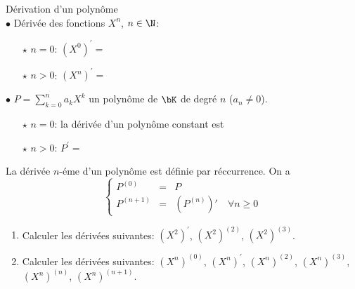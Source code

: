 \documentclass[a4paper, 11pt,reqno]{article}
\begin{document}
\begin{defi} D\'erivation d'un polyn\^ome\\

	$\bullet$ D\'eriv\'ee des fonctions $X^n$, $n\in\N$:\vsec\vsec
	\begin{itemize}
		\item[$\star$] $n=0$: $(X^0)^{\prime}=$\dotfill \vsec
		\item[$\star$] $n>0$: $(X^n)^{\prime}=$\dotfill \vsec
	\end{itemize}

	\quad

	$\bullet$ $P=\sum\limits_{k=0}^n a_kX^k$ un polyn\^ome de $\bK$ de degr\'e $n$ ($a_n\not= 0$).\vsec
	\begin{itemize}
		\item[$\star$] $n=0$: la d\'eriv\'ee d'un polyn\^ome constant est \dotfill  \vsec
		\item[$\star$] $n>0$: $P^{\prime}=$\dotfill \vsec
	\end{itemize}

\end{defi}
\vsec\vsec


\begin{defi}
	La dérivée $n$-éme d'un polynôme est définie par réccurrence. On a
	$$\left\{
		\begin{array}{ccl}
			P^{(0)}   & = & P                                \\
			P^{(n+1)} & = & (P^{(n)})' \quad \forall n\geq 0
		\end{array}
		\right.$$
\end{defi}


{\footnotesize \begin{exercice}
	\begin{enumerate}
		\item Calculer les d\'eriv\'ees suivantes: $(X^2)^{\prime}$, $(X^2)^{(2)}$, $(X^2)^{(3)}$.
		\item Calculer les d\'eriv\'ees suivantes: $(X^n)^{(0)}$, $(X^n)^{\prime}$, $(X^n)^{(2)}$, $(X^n)^{(3)}$, $(X^n)^{(n)}$, $(X^n)^{(n+1)}$.
	\end{enumerate}
\end{exercice}
}\vsec
\end{document}
